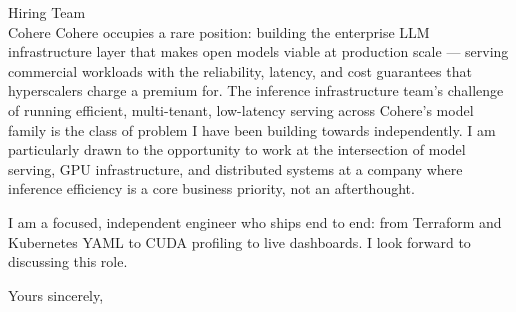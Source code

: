 \documentclass[a4paper]{letter}
\begin{document}
\begin{letter}{Hiring Team \\ Cohere}
Cohere occupies a rare position: building the enterprise LLM infrastructure layer that makes open models viable at production scale — serving commercial workloads with the reliability, latency, and cost guarantees that hyperscalers charge a premium for. The inference infrastructure team's challenge of running efficient, multi-tenant, low-latency serving across Cohere's model family is the class of problem I have been building towards independently. I am particularly drawn to the opportunity to work at the intersection of model serving, GPU infrastructure, and distributed systems at a company where inference efficiency is a core business priority, not an afterthought.

I am a focused, independent engineer who ships end to end: from Terraform and Kubernetes YAML to CUDA profiling to live dashboards. I look forward to discussing this role.

\closing{Yours sincerely,}

\end{letter}
\end{document}

